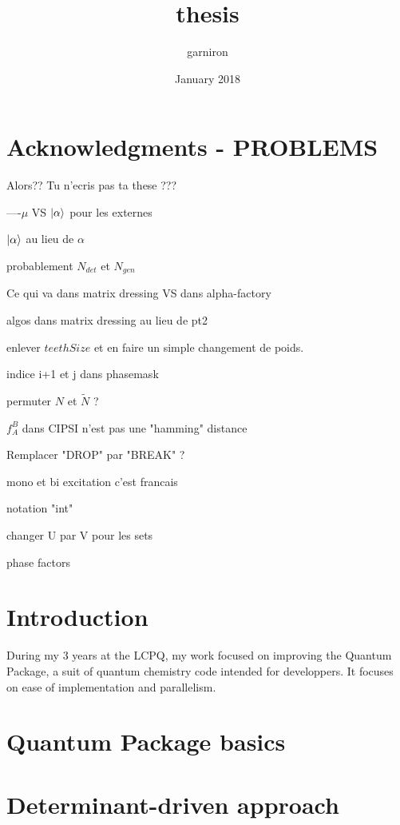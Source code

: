 \documentclass[12pt,a4paper]{report}
\title{thesis}
\author{garniron}
\date{January 2018}
\begin{document}
\dominitoc

\maketitle
\newpage

\chapter*{Acknowledgments - PROBLEMS}



Alors?? Tu n'ecris pas ta these ???


----$\mu$ VS $\ket \alpha$ pour les externes

$\ket \alpha$ au lieu de $\alpha$

probablement $N_{det}$ et $N_{gen}$

Ce qui va dans matrix dressing VS dans alpha-factory

algos dans matrix dressing au lieu de pt2

enlever $teethSize$ et en faire un simple changement de poids.

indice i+1 et j dans phasemask

permuter $N$ et $\tilde N$ ?

$f_A^B$ dans CIPSI n'est pas une "hamming" distance

Remplacer "DROP" par "BREAK" ?

mono et bi excitation c'est francais

notation "int"

changer U par V pour les sets

phase factors

\newpage

\tableofcontents
\newpage


\chapter{Introduction}

During my 3 years at the LCPQ, my work focused on improving the Quantum Package, a suit of quantum chemistry code intended for developpers. It focuses on ease of implementation and parallelism.

\chapter{Quantum Package basics}
\minitoc



\chapter{Determinant-driven approach}
\minitoc
\end{document}
